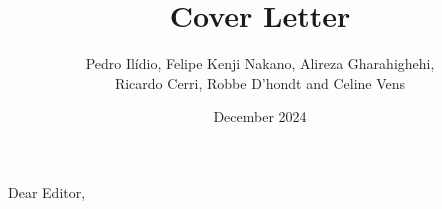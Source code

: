 \documentclass{article}
\title{Cover Letter}
\author{Pedro Ilídio, Felipe Kenji Nakano, Alireza Gharahighehi, \\ Ricardo Cerri, Robbe D'hondt and Celine Vens}
\date{December 2024}
\begin{document}
%
\maketitle



Dear Editor,
~\\
\end{document}
